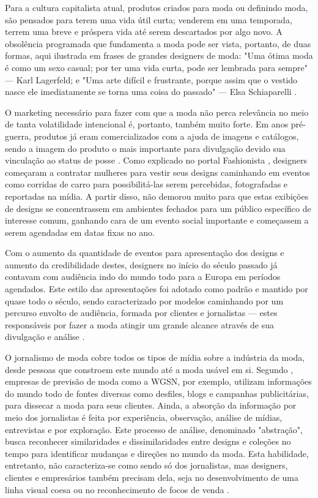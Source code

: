 \documentclass[12pt]{report}
\begin{document}
Para a cultura capitalista atual, produtos criados para moda ou definindo moda, são pensados para terem uma vida útil curta; venderem em uma temporada, terrem uma breve e próspera vida até serem descartados por algo novo. A obsolência programada que fundamenta a moda pode ser vista, portanto, de duas formas, aqui ilustrada em frases de grandes designers de moda: "Uma ótima moda é como um sexo casual; por ter uma vida curta, pode ser lembrada para sempre" --- Karl Lagerfeld; e "Uma arte difícil e frustrante, porque assim que o vestido nasce ele imediatamente se torna uma coisa do passado" --- Elsa Schiaparelli \cite{key}.

O marketing necessário para fazer com que a moda não perca relevância no meio de tanta volatilidade intencional é, portanto, também muito forte. Em anos pré-guerra, produtos já eram comercializados com a ajuda de imagens e catálogos, sendo a imagem do produto o mais importante para divulgação devido sua vinculação ao status de posse \cite{history}. Como explicado no portal Fashionista \cite{Fashionistasite}, designers começaram a contratar mulheres para vestir seus designs caminhando em eventos como corridas de carro para possibilitá-las serem percebidas, fotografadas e reportadas na mídia. A partir disso, não demorou muito para que estas exibições de designs se concentrassem em ambientes fechados para um público específico de interesse comum, ganhando cara de um evento social importante e começassem a serem agendadas em datas fixas no ano.

Com o aumento da quantidade de eventos para apresentação dos designs e aumento da credibilidade destes, designers no início do século passado já contavam com audiência indo do mundo todo para a Europa em períodos agendados. Este estilo das apresentações foi adotado como padrão e mantido por quase todo o século, sendo caracterizado por modelos caminhando por um percurso envolto de audiência, formada por clientes e jornalistas --- estes responsáveis por fazer a moda atingir um grande alcance através de sua divulgação e análise \cite{Fashionista}. 

O jornalismo de moda cobre todos os tipos de mídia sobre a indústria da moda, desde pessoas que constroem este mundo até a moda usável em si. Segundo \cite{jia}, empresas de previsão de moda como a WGSN, por exemplo, utilizam informações do mundo todo de fontes diversas como desfiles, blogs e campanhas publicitárias, para dissecar a moda para seus clientes. Ainda, a absorção da informação por meio dos jornalistas é feita por experiência, observação, análise de mídias, entrevistas e por exploração. Este processo de análise, denominado "abstração", busca reconhecer similaridades e dissimilaridades entre designs e coleções no tempo para identificar mudanças e direções no mundo da moda. Esta habilidade, entretanto, não caracteriza-se como sendo só dos jornalistas, mas designers, clientes e empresários também precisam dela, seja no desenvolvimento de uma linha visual coesa ou no reconhecimento de focos de venda \cite{jia}.  
\end{document}
